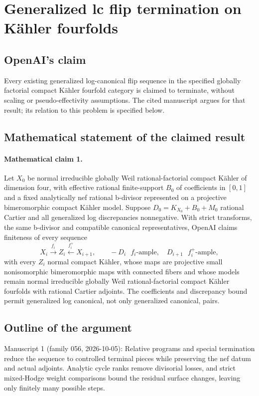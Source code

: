 \documentclass[11pt]{article}
\begin{document}
\section*{Generalized lc flip termination on Kähler fourfolds}

\subsection{OpenAI's claim}
Every existing generalized log-canonical flip sequence in the specified globally factorial compact Kähler fourfold category is claimed to terminate, without scaling or pseudo-effectivity assumptions. The cited manuscript argues for that result; its relation to this problem is specified below.

\subsection{Mathematical statement of the claimed result}
\paragraph{Mathematical claim 1.} Let $X_0$ be normal irreducible globally Weil rational-factorial compact Kähler of dimension four, with effective rational finite-support $B_0$ of coefficients in $[0,1]$ and a fixed analytically nef rational b-divisor represented on a projective bimeromorphic compact Kähler model. Suppose $D_0=K_{X_0}+B_0+M_0$ rational Cartier and all generalized log discrepancies nonnegative. With strict transforms, the same b-divisor and compatible canonical representatives, OpenAI claims finiteness of every sequence
\[
X_i\xrightarrow{f_i}Z_i\xleftarrow{f_i^+}X_{i+1},\qquad
-D_i\text{ }f_i\text{-ample},\quad D_{i+1}\text{ }f_i^+\text{-ample},
\]
with every $Z_i$ normal compact Kähler, whose maps are projective small nonisomorphic bimeromorphic maps with connected fibers and whose models remain normal irreducible globally Weil rational-factorial compact Kähler fourfolds with rational Cartier adjoints. The coefficients and discrepancy bound permit generalized log canonical, not only generalized canonical, pairs.

\subsection{Outline of the argument}
Manuscript 1 (family 056, 2026-10-05): Relative programs and special termination reduce the sequence to controlled terminal pieces while preserving the nef datum and actual adjoints. Analytic cycle ranks remove divisorial losses, and strict mixed-Hodge weight comparisons bound the residual surface changes, leaving only finitely many possible steps.
\end{document}
